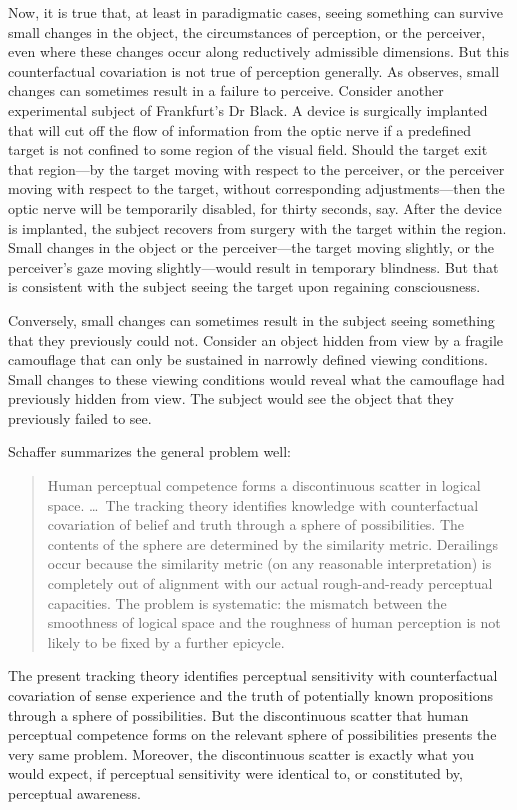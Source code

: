 \documentclass[12pt]{article}
\begin{document}
Now, it is true that, at least in paradigmatic cases, seeing something can survive small changes in the object, the circumstances of perception, or the perceiver, even where these changes occur along reductively admissible dimensions. But this counterfactual covariation is not true of perception generally.  As \citet{Johnston:2006uq} observes, small changes can sometimes result in a failure to perceive. Consider another experimental subject of Frankfurt's \citeyearpar{Frankfurt:1969kx} Dr Black. A device is surgically implanted that will cut off the flow of information from the optic nerve if a predefined target is not confined to some region of the visual field. Should the target exit that region---by the target moving with respect to the perceiver, or the perceiver moving with respect to the target, without corresponding adjustments---then the optic nerve will be temporarily disabled, for thirty seconds, say. After the device is implanted, the subject recovers from surgery with the target within the region. Small changes in the object or the perceiver---the target moving slightly, or the perceiver's gaze moving slightly---would result in temporary blindness. But that is consistent with the subject seeing the target upon regaining consciousness. 

Conversely, small changes can sometimes result in the subject seeing something that they previously could not. Consider an object hidden from view by a fragile camouflage that can only be sustained in narrowly defined viewing conditions. Small changes to these viewing conditions would reveal what the camouflage had previously hidden from view. The subject would see the object that they previously failed to see.

Schaffer summarizes the general problem well:
\begin{quote}
    Human perceptual competence forms a discontinuous scatter in logical space. \ldots\ The tracking theory identifies knowledge with counterfactual covariation of belief and truth through a sphere of possibilities. The contents of the sphere are determined by the similarity metric. Derailings occur because the similarity metric (on any reasonable interpretation) is completely out of alignment with our actual rough-and-ready perceptual capacities. The problem is systematic: the mismatch between the smoothness of logical space and the roughness of human perception is not likely to be fixed by a further epicycle. \citep[42]{Schaffer:2003vn}
\end{quote}
The present tracking theory identifies perceptual sensitivity with counterfactual covariation of sense experience and the truth of potentially known propositions through a sphere of possibilities. But the discontinuous scatter that human perceptual competence forms on the relevant sphere of possibilities presents the very same problem. Moreover, the discontinuous scatter is exactly what you would expect, if perceptual sensitivity were identical to, or constituted by, perceptual awareness. 
\end{document}
